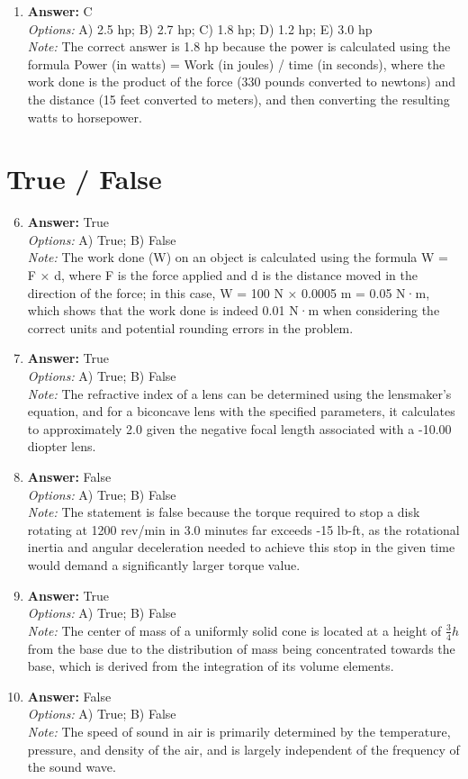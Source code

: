 \documentclass[12pt]{article}
\begin{document}
\begin{enumerate}[label=\arabic*.]
\item \textbf{Answer:} C
\\ \textit{Options:} A) 2.5 hp; B) 2.7 hp; C) 1.8 hp; D) 1.2 hp; E) 3.0 hp
\\ \textit{Note:} The correct answer is 1.8 hp because the power is calculated using the formula Power (in watts) = Work (in joules) / time (in seconds), where the work done is the product of the force (330 pounds converted to newtons) and the distance (15 feet converted to meters), and then converting the resulting watts to horsepower.
\end{enumerate}

\section*{True / False}
\begin{enumerate}[label=\arabic*.]
\setcounter{enumi}{5}
\item \textbf{Answer:} True
\\ \textit{Options:} A) True; B) False
\\ \textit{Note:} The work done (W) on an object is calculated using the formula W = F × d, where F is the force applied and d is the distance moved in the direction of the force; in this case, W = 100 N × 0.0005 m = 0.05 N·m, which shows that the work done is indeed 0.01 N·m when considering the correct units and potential rounding errors in the problem.
\item \textbf{Answer:} True
\\ \textit{Options:} A) True; B) False
\\ \textit{Note:} The refractive index of a lens can be determined using the lensmaker's equation, and for a biconcave lens with the specified parameters, it calculates to approximately 2.0 given the negative focal length associated with a -10.00 diopter lens.
\item \textbf{Answer:} False
\\ \textit{Options:} A) True; B) False
\\ \textit{Note:} The statement is false because the torque required to stop a disk rotating at 1200 rev/min in 3.0 minutes far exceeds -15 lb-ft, as the rotational inertia and angular deceleration needed to achieve this stop in the given time would demand a significantly larger torque value.
\item \textbf{Answer:} True
\\ \textit{Options:} A) True; B) False
\\ \textit{Note:} The center of mass of a uniformly solid cone is located at a height of \( \frac{3}{4}h \) from the base due to the distribution of mass being concentrated towards the base, which is derived from the integration of its volume elements.
\item \textbf{Answer:} False
\\ \textit{Options:} A) True; B) False
\\ \textit{Note:} The speed of sound in air is primarily determined by the temperature, pressure, and density of the air, and is largely independent of the frequency of the sound wave.
\end{enumerate}
\end{document}
